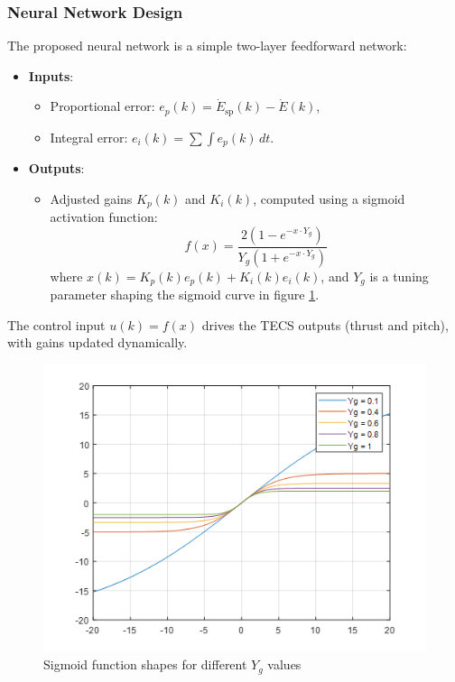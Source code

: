 \documentclass[journal,article,submit,pdftex,moreauthors]{Definitions/mdpi}
\begin{document}
\subsubsection{Neural Network Design}
The proposed neural network is a simple two-layer feedforward network:
\begin{itemize}
    \item \textbf{Inputs}:
    \begin{itemize}
        \item Proportional error: \(e_p(k) = \dot{E}_{\text{sp}}(k) - \dot{E}(k)\),
        \item Integral error: \(e_i(k) = \sum \int e_p(k) \, dt\).
    \end{itemize}
    \item \textbf{Outputs}:
    \begin{itemize}
        \item Adjusted gains \(K_p(k)\) and \(K_i(k)\), computed using a sigmoid activation function:
        \begin{equation}
            f(x) = \frac{2(1 - e^{-x \cdot Y_g})}{Y_g (1 + e^{-x \cdot Y_g})}
        \end{equation}
        where \(x(k) = K_p(k)e_p(k) + K_i(k)e_i(k)\), and \(Y_g\) is a tuning parameter shaping the sigmoid curve in figure \ref{fig:sigmoid_function_shapes}.
    \end{itemize}
\end{itemize}

The control input \(u(k) = f(x)\) drives the TECS outputs (thrust and pitch), with gains updated dynamically.

\begin{figure}[H]
    \centering
    \includegraphics[width=0.6\linewidth]{sigmoid_function_shapes.png}
    \caption{Sigmoid function shapes for different \(Y_g\) values}
    \label{fig:sigmoid_function_shapes}
\end{figure}
\end{document}
